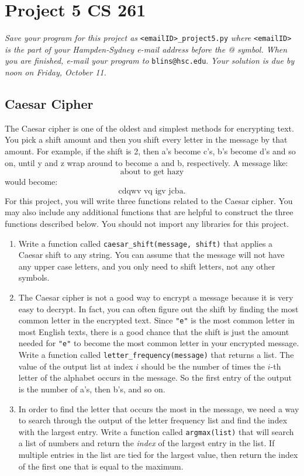\documentclass[12pt]{article}
\begin{document}
\section*{Project 5 \hfill CS 261}

\textit{Save your program for this project as} \verb|<emailID>_project5.py| \textit{where} \verb|<emailID>| \textit{is the part of your Hampden-Sydney e-mail address before the @ symbol. When you are finished, e-mail your program to} \verb|blins@hsc.edu|. \textit{Your solution is due by noon on Friday, October 11. }

\subsection*{Caesar Cipher}

The Caesar cipher is one of the oldest and simplest methods for encrypting text. You pick a shift amount and then you shift every letter in the message by that amount.  For example, if the shift is 2, then a's become c's, b's become d's and so on, until y and z wrap around to become a and b, respectively.  A message like:
$$\text{about to get hazy}$$
would become:
$$\text{cdqwv vq igv jcba}.$$
For this project, you will write three functions related to the Caesar cipher.  You may also include any additional functions that are helpful to construct the three functions described below.  You should not import any libraries for this project. 

\begin{enumerate}
\item Write a function called \verb|caesar_shift(message, shift)| that applies a Caesar shift to any string.  You can assume that the message will not have any upper case letters, and you only need to shift letters, not any other symbols. 

\item The Caesar cipher is not a good way to encrypt a message because it is very easy to decrypt.  In fact, you can often figure out the shift by finding the most common letter in the encrypted text.  Since \verb|"e"| is the most common letter in most English texts, there is a good chance that the shift is just the amount needed for \verb|"e"| to become the most common letter in your encrypted message.  Write a function called \verb|letter_frequency(message)| that returns a list.  The value of the output list at index $i$ should be the number of times the $i$-th letter of the alphabet occurs in the message.  So the first entry of the output is the number of a's, then b's, and so on. 


\item In order to find the letter that occurs the most in the message, we need a way to search through the output of the letter frequency list and find the index with the largest entry.  Write a function called \verb|argmax(list)| that will search a list of numbers and return the \emph{index} of the largest entry in the list.  If multiple entries in the list are tied for the largest value, then return the index of the first one that is equal to the maximum.  
\end{enumerate}
\end{document}
